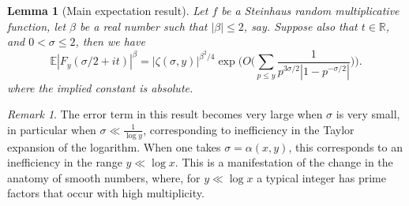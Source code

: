 \documentclass[12pt,a4paper,reqno]{amsart}
\numberwithin{equation}{section}
\def\R{\mathbb R}
\def\E{\mathbb E}
\def\leq {\leqslant}
\newtheorem{lemma}[theorem]{Lemma}
\theoremstyle{remark}
\newtheorem{remark}{Remark}
\theoremstyle{definition}
\numberwithin{equation}{section}
\theoremstyle{remark}
\def\E{\mathbb E}
\begin{document}
\begin{lemma}[Main expectation result]\label{l:exp result moderate y}
Let $f$ be a Steinhaus random multiplicative function, let $\beta$ be a real number such that $|\beta| \leq 2$, say. Suppose also that $t \in \R$, and $0 < \sigma \leq 2$, then we have
\[
\E |F_y (\sigma / 2 + it)|^{\beta} = |\zeta (\sigma, y)|^{\beta^2/4} \exp \biggl( O \biggl( \sum_{p \leq y} \frac{1}{p^{3 \sigma / 2} | 1 - p^{-\sigma/2}|} \biggr) \biggr).
\]
where the implied constant is absolute.
\end{lemma}
\begin{remark}\label{r:EP transition range}
The error term in this result becomes very large when $\sigma$ is very small, in particular when $\sigma \ll \frac{1}{\log y}$, corresponding to inefficiency in the Taylor expansion of the logarithm. When one takes $\sigma = \alpha(x,y)$, this corresponds to an inefficiency in the range $y \ll \log x$. This is a manifestation of the change in the anatomy of smooth numbers, where, for $y \ll \log x$ a typical integer has prime factors that occur with high multiplicity.
\end{remark}
\end{document}
